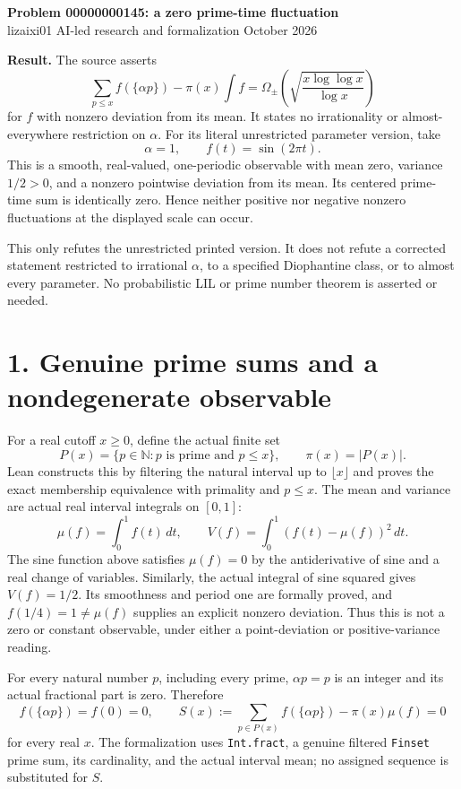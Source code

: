 \documentclass[10pt]{article}
\begin{document}
\begin{center}
{\Large\bfseries Problem 00000000145: a zero prime-time fluctuation}\\[5pt]
lizaixi01 \quad AI-led research and formalization  October 2026
\end{center}

\textbf{Result.} The source asserts
\[
 \sum_{p\le x} f(\{\alpha p\})-\pi(x)\int f
 =\Omega_{\pm}\!\left(\sqrt{\frac{x\log\log x}{\log x}}\right)
\]
for $f$ with nonzero deviation from its mean. It states no irrationality or almost-everywhere restriction on $\alpha$. For its literal unrestricted parameter version, take
\[
 \alpha=1,\qquad f(t)=\sin(2\pi t).
\]
This is a smooth, real-valued, one-periodic observable with mean zero, variance $1/2>0$, and a nonzero pointwise deviation from its mean. Its centered prime-time sum is identically zero. Hence neither positive nor negative nonzero fluctuations at the displayed scale can occur.

This only refutes the unrestricted printed version. It does not refute a corrected statement restricted to irrational $\alpha$, to a specified Diophantine class, or to almost every parameter. No probabilistic LIL or prime number theorem is asserted or needed.

\section*{1. Genuine prime sums and a nondegenerate observable}
For a real cutoff $x\ge0$, define the actual finite set
\[
 P(x)=\{p\in\mathbb N:p\text{ is prime and }p\le x\},\qquad\pi(x)=|P(x)|.
\]
Lean constructs this by filtering the natural interval up to $\lfloor x\rfloor$ and proves the exact membership equivalence with primality and $p\le x$. The mean and variance are actual real interval integrals on $[0,1]$:
\[
 \mu(f)=\int_0^1 f(t)\,dt,\qquad
 V(f)=\int_0^1(f(t)-\mu(f))^2\,dt.
\]
The sine function above satisfies $\mu(f)=0$ by the antiderivative of sine and a real change of variables. Similarly, the actual integral of sine squared gives $V(f)=1/2$. Its smoothness and period one are formally proved, and $f(1/4)=1\ne\mu(f)$ supplies an explicit nonzero deviation. Thus this is not a zero or constant observable, under either a point-deviation or positive-variance reading.

For every natural number $p$, including every prime, $\alpha p=p$ is an integer and its actual fractional part is zero. Therefore
\[
 f(\{\alpha p\})=f(0)=0,\qquad
 S(x):=\sum_{p\in P(x)}f(\{\alpha p\})-\pi(x)\mu(f)=0
\]
for every real $x$. The formalization uses \texttt{Int.fract}, a genuine filtered \texttt{Finset} prime sum, its cardinality, and the actual interval mean; no assigned sequence is substituted for $S$.
\end{document}
